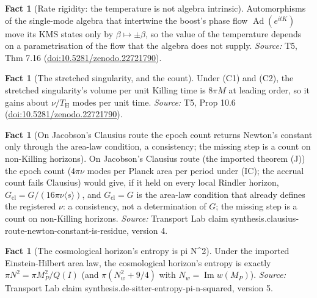 \documentclass[11pt]{article}
\theoremstyle{definition}
\newtheorem{fact}[theorem]{Fact}
\theoremstyle{plain}
\providecommand{\TH}{}\renewcommand{\TH}{T_{\mathrm{H}}}
\begin{document}
\begin{fact}[Rate rigidity: the temperature is not algebra intrinsic]\label{c:singularity.rate-rigidity-temperature-not-algebra-intrinsic}
Automorphisms of the single-mode algebra that intertwine the boost's phase flow $\operatorname{Ad}(e^{itK})$ move its KMS states only by $\beta \mapsto \pm\beta$, so the value of the temperature depends on a parametrisation of the flow that the algebra does not supply.
\emph{Source:} T5, Thm 7.16 (\href{https://doi.org/10.5281/zenodo.22721790}{doi:10.5281/zenodo.22721790}).
\end{fact}

\begin{fact}[The stretched singularity, and the count]\label{c:singularity.stretched-singularity-count}
Under (C1) and (C2), the stretched singularity's volume per unit Killing time is $8\pi M$ at leading order, so it gains about $\nu/\TH$ modes per unit time.
\emph{Source:} T5, Prop 10.6 (\href{https://doi.org/10.5281/zenodo.22721790}{doi:10.5281/zenodo.22721790}).
\end{fact}

\begin{fact}[On Jacobson's Clausius route the epoch count returns Newton's constant only through the area-law condition, a consistency; the missing step is a count on non-Killing horizons]\label{c:synthesis.clausius-route-newton-constant-is-residue}
On Jacobson's Clausius route (the imported theorem (J)) the epoch count ($4\pi\nu$ modes per Planck area per period under (IC); the accrual count fails Clausius) would give, if it held on every local Rindler horizon, $G_{\mathrm{cl}} = G/(16\pi\nu\langle s\rangle)$, and $G_{\mathrm{cl}} = G$ is the area-law condition that already defines the registered $\nu$: a consistency, not a determination of $G$; the missing step is a count on non-Killing horizons.
\emph{Source:} Transport Lab claim synthesis.clausius-route-newton-constant-is-residue, version 4.
\end{fact}

\begin{fact}[The cosmological horizon's entropy is pi N\^{}2]\label{c:synthesis.de-sitter-entropy-pi-n-squared}
Under the imported Einstein-Hilbert area law, the cosmological horizon's entropy is exactly $\pi N^{2} = \pi M_{P}^{2}/Q(I)$ (and $\pi(N_{w}^{2} + 9/4)$ with $N_{w} = \operatorname{Im} w(M_{P})$).
\emph{Source:} Transport Lab claim synthesis.de-sitter-entropy-pi-n-squared, version 5.
\end{fact}
\end{document}
